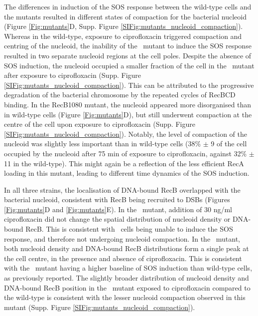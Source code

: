 The differences in induction of the SOS response between the wild-type cells and the mutants resulted in different states of compaction for the bacterial nucleoid (Figure \ref{Fig:mutants}D, Supp. Figure \ref{SIFig:mutants_nucleoid_compaction}). Whereas in the wild-type, exposure to ciprofloxacin triggered compaction and centring of the nucleoid, the inability of the \dreca\ mutant to induce the SOS response resulted in two separate nucleoid regions at the cell poles. Despite the absence of SOS induction, the nucleoid occupied a smaller fraction of the cell in the \dreca\ mutant after exposure to ciprofloxacin (Supp. Figure \ref{SIFig:mutants_nucleoid_compaction}). This can be attributed to the progressive degradation of the bacterial chromosome by the repeated cycles of RecBCD binding\cite{Capaldo1975,Skarstad1993}. In the RecB1080 mutant, the nucleoid appeared more disorganised than in wild-type cells (Figure \ref{Fig:mutants}D), but still underwent compaction at the centre of the cell upon exposure to ciprofloxacin (Supp. Figure \ref{SIFig:mutants_nucleoid_compaction}). Notably, the level of compaction of the nucleoid was slightly less important than in wild-type cells (38\% $\pm$ 9 of the cell occupied by the nucleoid after 75 min of exposure to ciprofloxacin, against 32\% $\pm$ 11 in the wild-type). This might again be a reflection of the less efficient RecA loading in this mutant, leading to different time dynamics of the SOS induction.

In all three strains, the localisation of DNA-bound RecB overlapped with the bacterial nucleoid, consistent with RecB being recruited to DSBs (Figures \ref{Fig:mutants}D and \ref{Fig:mutants}E). In the \dreca\ mutant, addition of 30 ng/ml ciprofloxacin did not change the spatial distribution of nucleoid density or DNA-bound RecB. This is consistent with \dreca\ cells being unable to induce the SOS response, and therefore not undergoing nucleoid compaction. In the \geneteneighty\ mutant, both nucleoid density and DNA-bound RecB distributions form a single peak at the cell centre, in the presence and absence of ciprofloxacin. This is consistent with the \geneteneighty\ mutant having a higher baseline of SOS induction than wild-type cells, as previously reported\cite{Lepore2023}. The slightly broader distribution of nucleoid density and DNA-bound RecB position in the \geneteneighty\ mutant exposed to ciprofloxacin compared to the wild-type is consistent with the lesser nucleoid compaction observed in this mutant (Supp. Figure \ref{SIFig:mutants_nucleoid_compaction}).


